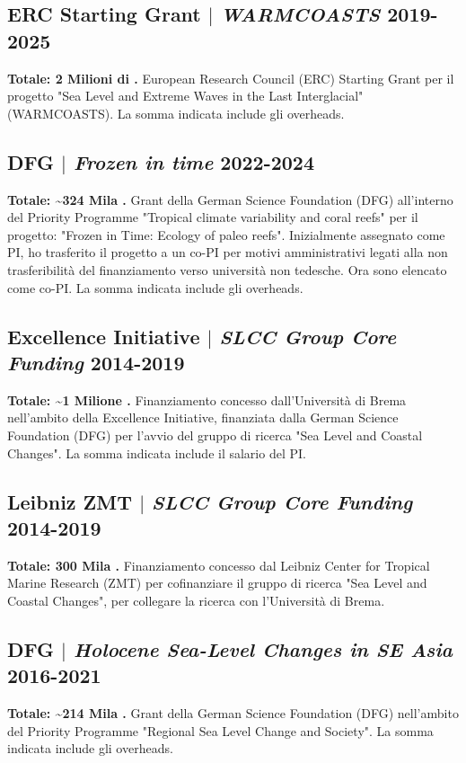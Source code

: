 \documentclass[11pt]{article}
\begin{document}
\bigskip

\subsection{ERC Starting Grant $|$ {\normalfont\textit{WARMCOASTS}} \hfill 2019-2025}
{\footnotesize \textbf{Totale: 2 Milioni di \texteuro.} European Research Council (ERC) Starting Grant per il progetto "Sea Level and Extreme Waves in the Last Interglacial" (WARMCOASTS). La somma indicata include gli overheads.}
\bigskip

\subsection{DFG $|$ {\normalfont\textit{Frozen in time}} \hfill 2022-2024}
{\footnotesize \textbf{Totale: \textasciitilde324 Mila \texteuro.} Grant della German Science Foundation (DFG) all'interno del Priority Programme "Tropical climate variability and coral reefs" per il progetto: "Frozen in Time: Ecology of paleo reefs". Inizialmente assegnato come PI, ho trasferito il progetto a un co-PI per motivi amministrativi legati alla non trasferibilità del finanziamento verso università non tedesche. Ora sono elencato come co-PI. La somma indicata include gli overheads.}
\bigskip

\subsection{Excellence Initiative $|$ {\normalfont\textit{SLCC Group Core Funding}} \hfill 2014-2019}
{\footnotesize \textbf{Totale: \textasciitilde1 Milione \texteuro.} Finanziamento concesso dall'Università di Brema nell'ambito della Excellence Initiative, finanziata dalla German Science Foundation (DFG) per l'avvio del gruppo di ricerca "Sea Level and Coastal Changes". La somma indicata include il salario del PI.}
\bigskip

\subsection{Leibniz ZMT $|$ {\normalfont\textit{SLCC Group Core Funding}} \hfill 2014-2019}
{\footnotesize \textbf{Totale: 300 Mila \texteuro.} Finanziamento concesso dal Leibniz Center for Tropical Marine Research (ZMT) per cofinanziare il gruppo di ricerca "Sea Level and Coastal Changes", per collegare la ricerca con l'Università di Brema.}
\bigskip

\subsection{DFG $|$ {\normalfont\textit{Holocene Sea-Level Changes in SE Asia}} \hfill 2016-2021}
{\footnotesize \textbf{Totale: \textasciitilde214 Mila \texteuro.} Grant della German Science Foundation (DFG) nell'ambito del Priority Programme "Regional Sea Level Change and Society". La somma indicata include gli overheads.}
\bigskip
\end{document}
